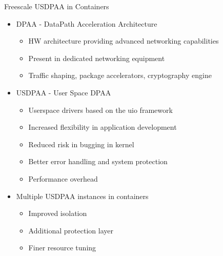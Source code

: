 \begin{frame}{Freescale USDPAA in Containers}
	\begin{itemize}
	\item DPAA - DataPath Acceleration Architecture
		\begin{itemize}
		\item HW architecture providing advanced networking capabilities
		\item Present in dedicated networking equipment
		\item Traffic shaping, package accelerators, cryptography engine
		\end{itemize}
	\item USDPAA - User Space DPAA
		\begin{itemize}
		\item Userspace drivers based on the uio framework
		\item Increased flexibility in application development
		\item Reduced risk in bugging in kernel
		\item Better error handling and system protection
		\item Performance overhead
		\end{itemize}
	\item Multiple USDPAA instances in containers
		\begin{itemize}
		\item Improved isolation
		\item Additional protection layer
		\item Finer resource tuning
		\end{itemize}
	\end{itemize}
\end{frame}